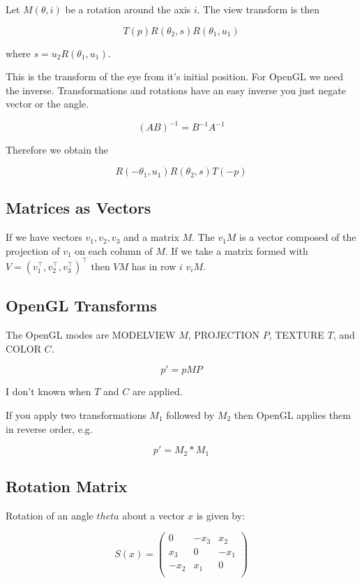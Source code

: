 \documentclass[12pt]{article}
\begin{document}
Let $M(\theta, i)$ be a rotation around the axis $i$. The view
transform is then

\[
  T(p) R(\theta_2, s) R(\theta_1, u_1) 
\]

where $s = u_2 R(\theta_1, u_1)$.

This is the transform of the eye from it's initial position. For
OpenGL we need the inverse. Transformations and rotations have an easy
inverse you just negate vector or the angle.

\[
   (AB)^{-1} = B^{-1} A^{-1}
\]

Therefore we obtain the 

\[
  R(-\theta_1, u_1) R(\theta_2, s) T(-p) 
\]

\subsection{Matrices as Vectors}

If we have vectors $v_1, v_2, v_3$ and a matrix $M$. The $v_1 M$ is a
vector composed of the projection of $v_1$ on each column of $M$. If
we take a matrix formed with $V = (v_1^\top, v_2^\top, v_3^\top)^\top$
then $VM$ has in row $i$ $v_iM$.


\subsection{OpenGL Transforms}

The OpenGL modes are MODELVIEW $M$, PROJECTION $P$, TEXTURE $T$, and
COLOR $C$.

\[
  p' = pMP
\]

I don't known when $T$ and $C$ are applied.

If you apply two transformations $M_1$ followed by $M_2$ then OpenGL
applies them in reverse order, e.g.

\[
  p' = M_2 * M_1
\]

\subsection{Rotation Matrix}

Rotation of an angle $theta$ about a vector $x$ is given by:

\[
  S(x) = \left ( \begin{array}{ccc}
     0    & -x_3 & x_2    \\
     x_3  & 0    & -x_1   \\
     -x_2 & x_1  & 0      \\
  \end{array} \right )
\]
\end{document}
